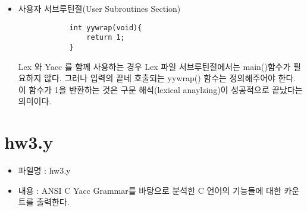 \documentclass{article}
\begin{document}
\begin{itemize}
\begin{itemize}
		\item {\bf 규칙절 : 공백}
		\begin{lstlisting}
		[ \t\v\n\f.]		{;}
		\end{lstlisting}
		공백 또는 위해서 작성한 규칙 이외의 문자열(.)은 무시한다.
	\end{itemize}

	\item 사용자 서브루틴절(User Subroutines Section)	
		\begin{lstlisting}
			int yywrap(void){
				return 1;
			}
		\end{lstlisting}
		Lex 와 Yacc 를 함께 사용하는 경우 Lex 파일 서브루틴절에서는 main()함수가 필요하지 않다.
		그러나 입력의 끝네 호출되는 yywrap() 함수는 정의해주어야 한다. 이 함수가 1을 반환하는 것은 구문
		해석(lexical anaylzing)이 성공적으로 끝났다는 의미이다.
\end{itemize}

\newpage

\section{hw3.y}

\begin{itemize}
	\item 파일명 : hw3.y
	\item 내용 : ANSI C Yacc Grammar를 바탕으로 분석한 C 언어의 기능들에 대한 카운트를 출력한다.
\end{itemize}
\end{document}
